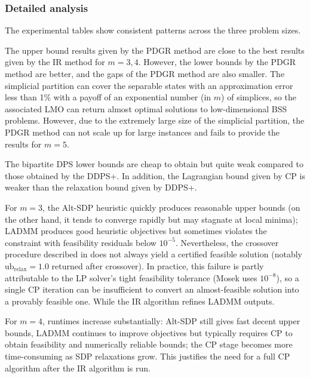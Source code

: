 \documentclass[smallextended]{svjour3}
\newcommand{\1}{\mathbf{1}}
\newcommand{\relx}{\text{relax}}
\newcommand{\ub}{\text{ub}}
\begin{document}
\subsubsection{Detailed analysis}
The experimental tables show consistent patterns across the three problem sizes.


The upper bound results given by the PDGR method are close to the best results given by the IR method for $m=3,4$. However, the  lower bounds by the PDGR method are better, and the gaps of the PDGR method are also smaller. The simplicial partition can cover the separable states with an approximation error less than 1\% with a payoff of an exponential number (in $m$) of simplices, so the associated LMO can return almost optimal solutions to low-dimensional BSS problems. However, due to the extremely large size of the simplicial partition, the PDGR method can not scale up for large instances and fails to provide the results for $m=5$.


The bipartite DPS lower bounds are cheap to obtain but quite weak compared to those obtained by the DDPS+. In addition, the Lagrangian bound given by CP is weaker than the relaxation bound given by DDPS+.


For $m=3$, the Alt-SDP heuristic quickly produces reasonable upper bounds (on the other hand, it tends to converge rapidly but may stagnate at local minima); LADMM produces good heuristic objectives but sometimes violates the constraint with feasibility residuals below $10^{-5}$. Nevertheless, the crossover procedure described in  does not always yield a certified feasible solution  (notably  $\ub_{\relx}=1.0$ returned after crossover). In practice, this failure is partly attributable to the LP solver's tight feasibility tolerance (Mosek uses $10^{-8}$), so a single CP iteration can be insufficient to convert an almost-feasible solution into a provably feasible one.  While the IR algorithm refines LADMM outputs.


For $m=4$, runtimes increase substantially: Alt-SDP still gives fast decent upper bounds, LADMM continues to improve objectives but typically requires CP to obtain feasibility and numerically reliable bounds; the CP stage becomes more time-consuming as SDP relaxations grow.  This justifies the need for a full CP algorithm after the IR algorithm is run.
\end{document}
